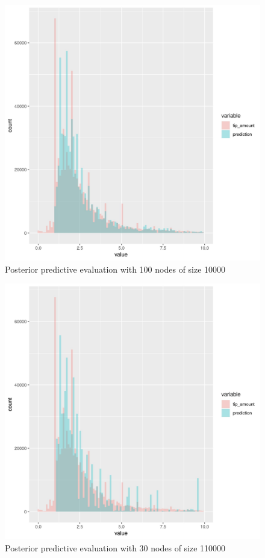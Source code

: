\documentclass[11pt]{article}
\begin{document}
\begin{figure}[htbp]
\centering
\includegraphics[width=.9\linewidth]{./plots/rfNodesize10000Maxnode100PosteriorPredictive.jpg}
\caption{\label{fig:org5886c5b}
Posterior predictive evaluation with 100 nodes of size 10000}
\end{figure}

\begin{figure}[htbp]
\centering
\includegraphics[width=.9\linewidth]{./plots/rfNodesize110000Maxnode30PosteriorPredictive.jpg}
\caption{\label{fig:org79ae7b8}
Posterior predictive evaluation with 30 nodes of size 110000}
\end{figure}
\end{document}

